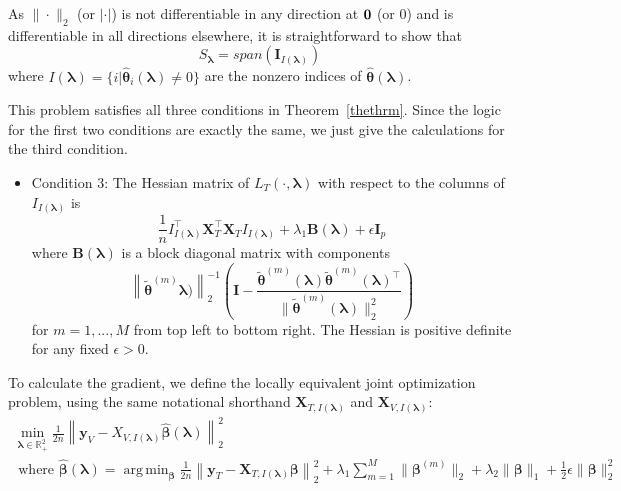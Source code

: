 \documentclass[10pt,letterpaper]{article}
\DeclareMathOperator*{\argmin}{arg\,min}
\begin{document}
As $\|\cdot\|_2$ (or $|\cdot|$) is not differentiable in any direction at ${\bf 0}$ (or $0$) and is differentiable in all directions elsewhere, it is straightforward to show that 
\begin{equation}
S_{\boldsymbol \lambda} = span(\boldsymbol I_{I(\boldsymbol\lambda)})
\end{equation}
where $I(\boldsymbol\lambda) = \{i | \hat{\boldsymbol{\theta}}_i(\boldsymbol\lambda) \ne 0\}$ are the nonzero indices of $\hat{\boldsymbol{\theta}}(\boldsymbol{\lambda})$. 

This problem satisfies all three conditions in Theorem~\ref{thethrm}. Since the logic for the first two conditions are exactly the same, we just give the calculations for the third condition.

\begin{itemize}
\item[] Condition 3: The Hessian matrix of $L_T(\cdot, \boldsymbol{\lambda})$ with respect to the columns of $I_{I(\boldsymbol \lambda)}$ is
\begin{equation}
\frac{1}{n} I_{I(\boldsymbol \lambda)}^\top \boldsymbol{X}_{T}^\top \boldsymbol{X}_{T} I_{I(\boldsymbol \lambda)}
+ \lambda_1 \boldsymbol{B}(\boldsymbol\lambda)
+ \epsilon \boldsymbol I_p
\end{equation}
where $\boldsymbol{B}(\boldsymbol\lambda)$ is a block diagonal matrix with components 
\begin{equation}
\left \| \tilde{\boldsymbol{\theta}}^{(m)}
\boldsymbol{\lambda})\right\|_2^{-1} 
\left (
\boldsymbol{I} - 
\frac{\tilde{\boldsymbol{\theta}}^{(m)}(\boldsymbol{\lambda})\tilde{\boldsymbol{\theta}}^{(m)}(\boldsymbol{\lambda})^\top}{\|\tilde{\boldsymbol{\theta}}^{(m)}(\boldsymbol{\lambda})\|_2^2}
\right)
\end{equation}
for $m=1,...,M$ from top left to bottom right. The Hessian is positive definite for any fixed $\epsilon > 0$.
\hfill {}
\end{itemize}

To calculate the gradient, we define the locally equivalent joint optimization problem, using the same notational shorthand $\boldsymbol{X}_{T, I(\boldsymbol\lambda)}$ and $\boldsymbol{X}_{V, I(\boldsymbol\lambda)}$:
\begin{equation}
\begin{array}{c}
\min_{\boldsymbol{\lambda} \in \mathbb{R}^2_{+}} \frac{1}{2n} \left \| \boldsymbol{y}_V - X_{V,I(\boldsymbol\lambda)} \hat{\boldsymbol\beta}(\boldsymbol{\lambda}) \right \|^2_2 \\
\text{ where }
\hat{\boldsymbol{\beta}}(\boldsymbol{\lambda}) = \argmin_{\boldsymbol \beta}
\frac{1}{2n} \left \| \boldsymbol{y}_T - \boldsymbol{X}_{T, I(\boldsymbol\lambda)} \boldsymbol \beta \right \|^2_2
+ \lambda_1 \sum_{m=1}^M \| \boldsymbol \beta^{(m)} \|_2
+ \lambda_2 \| \boldsymbol \beta \|_1
+ \frac{1}{2}\epsilon \| \boldsymbol \beta \|_2^2
\end{array}
\end{equation}
\end{document}
